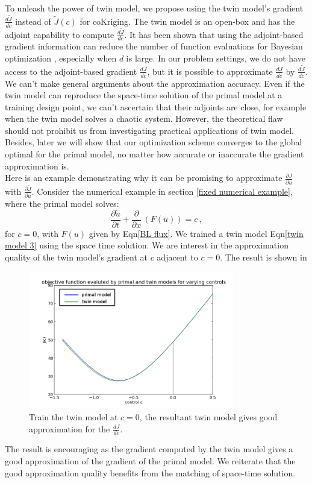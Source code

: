 \documentclass[a4paper,onecolumn]{article}
\theoremstyle{remark}
\begin{document}
\noindent To unleash the power of twin model, we propose using the twin model's gradient
$\frac{d\tilde{J}}{d c}$ instead of $\tilde{J}(c)$ for coKriging.
The twin model is an open-box and has the adjoint capability to compute $\frac{d\tilde{J}}{dc}$.
It has been shown that using the adjoint-based gradient information can 
reduce the number of function evaluations for Bayesian optimization
\cite{adjoint gradient cokriging without MLE, gradient kriging surrogate},
especially when $d$ is large. 
In our problem settings, we do not have access to the adjoint-based gradient $\frac{dJ}{dc}$,
but it is possible to approximate $\frac{dJ}{dc}$ by $\frac{d\tilde{J}}{dc}$.
We can't make general arguments about the approximation accuracy. 
Even if the twin model can reproduce the space-time solution of the primal model
at a training design point, we can't ascertain that their adjoints 
are close, for example when the twin model solves a chaotic system.
However, the theoretical flaw should not prohibit us from investigating
practical applications of twin model. Besides, later we will show that our optimization scheme 
converges to the global optimal for the primal model,
no matter how accurate or inaccurate the gradient approximation is.\\

\noindent Here is an example demonstrating why it can be promising to approximate
$\frac{\partial J}{\partial u}$ with $\frac{\partial \tilde{J}}{\partial u}$.
Consider the numerical example in section \ref{fixed numerical example}, where the
primal model solves:
\begin{equation}
    \frac{\partial \tilde{u}}{\partial t} + \frac{\partial}{\partial x}\,
    \left(F(u)\right) = c\,,
\end{equation}
for $c=0$, with $F(u)$ given by Eqn\eqref{BL flux}. We trained a twin model
Eqn\eqref{twin model 3} using the space time solution. We are interest in
the approximation quality of the twin model's gradient at $c$ adjacent to $c=0$.
The result is shown in 
\begin{figure}[H]\begin{center}
    \includegraphics[height=6cm]{J_twin_vs_primal.png}
    \caption{Train the twin model at $c=0$, the resultant twin model gives good approximation for
    the $\frac{dJ}{dc}$.}
\end{center}\end{figure}
\noindent The result is encouraging as the gradient computed by the twin model gives a good approximation
of the gradient of the primal model. We reiterate that the good approximation quality benefits from 
the matching of space-time solution.
\end{document}
